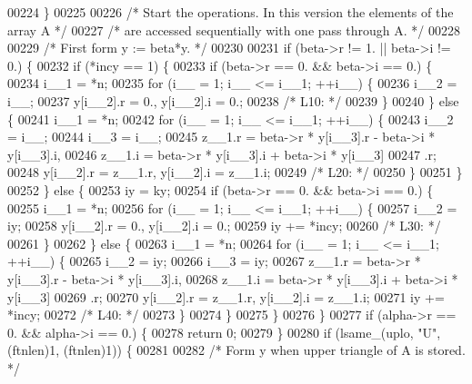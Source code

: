 \begin{DoxyCode}
00224     \}
00225 
00226 \textcolor{comment}{/*     Start the operations. In this version the elements of the array A */}
00227 \textcolor{comment}{/*     are accessed sequentially with one pass through A. */}
00228 
00229 \textcolor{comment}{/*     First form  y := beta*y. */}
00230 
00231     \textcolor{keywordflow}{if} (beta->r != 1. || beta->i != 0.) \{
00232     \textcolor{keywordflow}{if} (*incy == 1) \{
00233         \textcolor{keywordflow}{if} (beta->r == 0. && beta->i == 0.) \{
00234         i\_\_1 = *n;
00235         \textcolor{keywordflow}{for} (i\_\_ = 1; i\_\_ <= i\_\_1; ++i\_\_) \{
00236             i\_\_2 = i\_\_;
00237             y[i\_\_2].r = 0., y[i\_\_2].i = 0.;
00238 \textcolor{comment}{/* L10: */}
00239         \}
00240         \} \textcolor{keywordflow}{else} \{
00241         i\_\_1 = *n;
00242         \textcolor{keywordflow}{for} (i\_\_ = 1; i\_\_ <= i\_\_1; ++i\_\_) \{
00243             i\_\_2 = i\_\_;
00244             i\_\_3 = i\_\_;
00245             z\_\_1.r = beta->r * y[i\_\_3].r - beta->i * y[i\_\_3].i, 
00246                 z\_\_1.i = beta->r * y[i\_\_3].i + beta->i * y[i\_\_3]
00247                 .r;
00248             y[i\_\_2].r = z\_\_1.r, y[i\_\_2].i = z\_\_1.i;
00249 \textcolor{comment}{/* L20: */}
00250         \}
00251         \}
00252     \} \textcolor{keywordflow}{else} \{
00253         iy = ky;
00254         \textcolor{keywordflow}{if} (beta->r == 0. && beta->i == 0.) \{
00255         i\_\_1 = *n;
00256         \textcolor{keywordflow}{for} (i\_\_ = 1; i\_\_ <= i\_\_1; ++i\_\_) \{
00257             i\_\_2 = iy;
00258             y[i\_\_2].r = 0., y[i\_\_2].i = 0.;
00259             iy += *incy;
00260 \textcolor{comment}{/* L30: */}
00261         \}
00262         \} \textcolor{keywordflow}{else} \{
00263         i\_\_1 = *n;
00264         \textcolor{keywordflow}{for} (i\_\_ = 1; i\_\_ <= i\_\_1; ++i\_\_) \{
00265             i\_\_2 = iy;
00266             i\_\_3 = iy;
00267             z\_\_1.r = beta->r * y[i\_\_3].r - beta->i * y[i\_\_3].i, 
00268                 z\_\_1.i = beta->r * y[i\_\_3].i + beta->i * y[i\_\_3]
00269                 .r;
00270             y[i\_\_2].r = z\_\_1.r, y[i\_\_2].i = z\_\_1.i;
00271             iy += *incy;
00272 \textcolor{comment}{/* L40: */}
00273         \}
00274         \}
00275     \}
00276     \}
00277     \textcolor{keywordflow}{if} (alpha->r == 0. && alpha->i == 0.) \{
00278     \textcolor{keywordflow}{return} 0;
00279     \}
00280     \textcolor{keywordflow}{if} (lsame\_(uplo, \textcolor{stringliteral}{"U"}, (ftnlen)1, (ftnlen)1)) \{
00281 
00282 \textcolor{comment}{/*        Form  y  when upper triangle of A is stored. */}

\end{DoxyCode}
